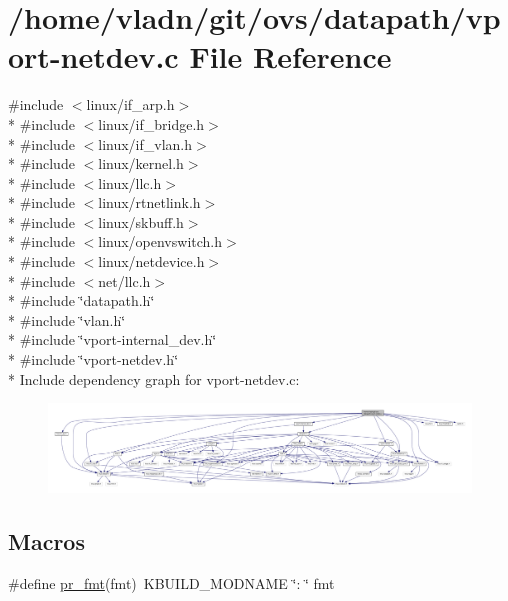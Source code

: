 \hypertarget{vport-netdev_8c}{}\section{/home/vladn/git/ovs/datapath/vport-\/netdev.c File Reference}
\label{vport-netdev_8c}
{\ttfamily \#include $<$linux/if\+\_\+arp.\+h$>$}\\*
{\ttfamily \#include $<$linux/if\+\_\+bridge.\+h$>$}\\*
{\ttfamily \#include $<$linux/if\+\_\+vlan.\+h$>$}\\*
{\ttfamily \#include $<$linux/kernel.\+h$>$}\\*
{\ttfamily \#include $<$linux/llc.\+h$>$}\\*
{\ttfamily \#include $<$linux/rtnetlink.\+h$>$}\\*
{\ttfamily \#include $<$linux/skbuff.\+h$>$}\\*
{\ttfamily \#include $<$linux/openvswitch.\+h$>$}\\*
{\ttfamily \#include $<$linux/netdevice.\+h$>$}\\*
{\ttfamily \#include $<$net/llc.\+h$>$}\\*
{\ttfamily \#include \char`\"{}datapath.\+h\char`\"{}}\\*
{\ttfamily \#include \char`\"{}vlan.\+h\char`\"{}}\\*
{\ttfamily \#include \char`\"{}vport-\/internal\+\_\+dev.\+h\char`\"{}}\\*
{\ttfamily \#include \char`\"{}vport-\/netdev.\+h\char`\"{}}\\*
Include dependency graph for vport-\/netdev.c\+:
\nopagebreak
\begin{figure}[H]
\begin{center}
\leavevmode
\includegraphics[width=350pt]{vport-netdev_8c__incl}
\end{center}
\end{figure}
\subsection*{Macros}
\begin{DoxyCompactItemize}
\item 
\#define \hyperlink{vport-netdev_8c_a1f8c165bf4196327bc3abff648276d92}{pr\+\_\+fmt}(fmt)~K\+B\+U\+I\+L\+D\+\_\+\+M\+O\+D\+N\+A\+M\+E \char`\"{}\+: \char`\"{} fmt
\end{DoxyCompactItemize}
